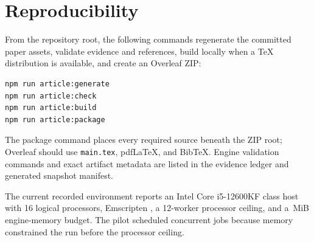 \section{Reproducibility}
From the repository root, the following commands regenerate the committed paper assets, validate evidence and references, build locally when a TeX distribution is available, and create an Overleaf ZIP:
\begin{verbatim}
npm run article:generate
npm run article:check
npm run article:build
npm run article:package
\end{verbatim}
The package command places every required source beneath the ZIP root; Overleaf should use \texttt{main.tex}, pdfLaTeX, and BibTeX. Engine validation commands and exact artifact metadata are listed in the evidence ledger and generated snapshot manifest.

The current recorded environment reports an Intel Core i5-12600KF class host with 16 logical processors, Emscripten \EmscriptenVersion, a 12-worker processor ceiling, and a \EngineMemoryMiB\,MiB engine-memory budget. The pilot scheduled \PilotScheduledJobs concurrent jobs because memory constrained the run before the processor ceiling.
